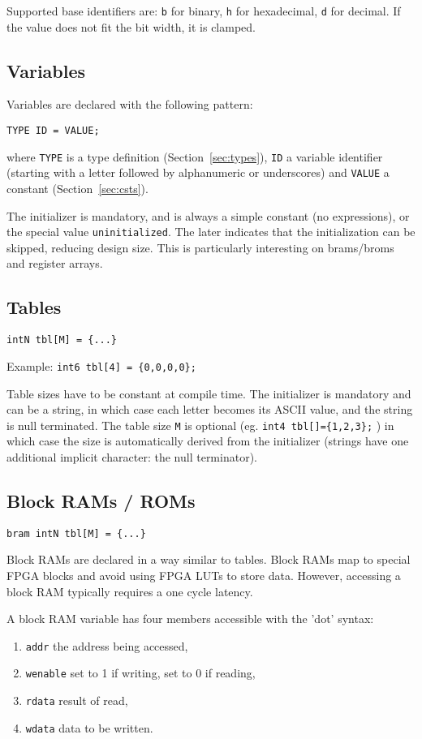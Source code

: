 \documentclass[a4]{article}
\begin{document}
Supported base identifiers are: \texttt{b} for binary, \texttt{h} for hexadecimal, \texttt{d} for decimal. If the value does not fit the bit width, it is clamped.

\subsection{Variables}

Variables are declared with the following pattern:

\texttt{TYPE ID = VALUE;}

\noindent where \texttt{TYPE} is a type definition (Section~\ref{sec:types}), \texttt{ID} a variable identifier (starting with a letter followed by alphanumeric or underscores) and \texttt{VALUE} a constant (Section~\ref{sec:csts}).

The initializer is mandatory, and is always a simple constant (no expressions), or the special
value \texttt{uninitialized}. The later indicates that the initialization can be skipped, reducing design size. This is particularly interesting on brams/broms and register arrays.

\subsection{Tables}

\texttt{intN tbl[M] = \{...\} }

\noindent Example:  \texttt{int6 tbl[4] = \{0,0,0,0\};}

\noindent Table sizes have to be constant at compile time. The initializer is mandatory and can be a string, in which case each letter becomes its ASCII value, and the string is null terminated. The table size \texttt{M} is optional (eg. \texttt{int4 tbl[]=\{1,2,3\};} ) in which case the size is automatically derived from the initializer (strings have one additional implicit character: the null terminator).

\subsection{Block RAMs / ROMs}

\texttt{bram intN tbl[M] = \{...\} }

\noindent Block RAMs are declared in a way similar to tables. Block RAMs map to special FPGA blocks and avoid using FPGA LUTs to store data. However, accessing a block RAM typically requires a one cycle latency.

A block RAM variable has four members accessible with the 'dot' syntax: 
\begin{enumerate}
	\item {\tt addr} the address being accessed,
	\item {\tt wenable} set to 1 if writing, set to 0 if reading,
	\item {\tt rdata} result of read,
	\item {\tt wdata} data to be written.
\end{enumerate}
\end{document}
